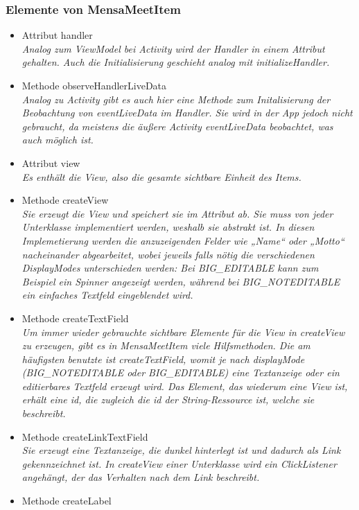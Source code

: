 \documentclass[a4paper]{scrreprt}
\begin{document}
\subsubsection{Elemente von MensaMeetItem}
\begin{itemize}
\item Attribut handler \\
\textit{Analog zum ViewModel bei Activity wird der Handler in einem Attribut gehalten. Auch die Initialisierung geschieht analog mit initializeHandler.}
\item Methode observeHandlerLiveData\\
\textit{Analog zu Activity gibt es auch hier eine Methode zum Initalisierung der Beobachtung von eventLiveData im Handler. Sie wird in der App jedoch nicht gebraucht, da meistens die äußere Activity eventLiveData beobachtet, was auch möglich ist. }
\item Attribut view \\
\textit{Es enthält die View, also die gesamte sichtbare Einheit des Items.}
\item Methode createView\\
\textit{Sie erzeugt die View und speichert sie im Attribut ab. Sie muss von jeder Unterklasse implementiert werden, weshalb sie abstrakt ist. In diesen Implemetierung werden die anzuzeigenden Felder wie „Name“ oder „Motto“ nacheinander abgearbeitet, wobei jeweils falls nötig die verschiedenen DisplayModes unterschieden werden: Bei
BIG\_EDITABLE kann zum Beispiel ein Spinner angezeigt werden, während bei BIG\_NOTEDITABLE ein einfaches Textfeld eingeblendet wird. }
\item Methode createTextField \\
\textit{Um immer wieder gebrauchte sichtbare Elemente für die View in createView zu erzeugen, gibt es in MensaMeetItem viele Hilfsmethoden. Die am häufigsten benutzte ist createTextField, womit je nach displayMode (BIG\_NOTEDITABLE oder BIG\_EDITABLE) eine Textanzeige oder ein editierbares Textfeld erzeugt wird. Das Element, das wiederum eine View ist, erhält eine id, die zugleich die id der String-Ressource ist, welche sie beschreibt. }
\item Methode createLinkTextField\\
\textit{Sie erzeugt eine Textanzeige, die dunkel hinterlegt ist und dadurch als Link gekennzeichnet ist. In createView einer Unterklasse wird ein ClickListener angehängt, der das Verhalten nach dem Link beschreibt.}
\item Methode createLabel \\

\end{itemize}
\end{document}
